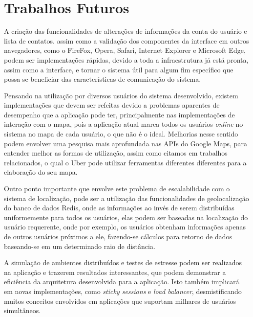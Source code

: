 \chapter{Trabalhos Futuros}
A criação das funcionalidades de alterações de informações da conta do usuário e lista de contatos. assim como a validação dos componentes da interface em outros navegadores, como o FireFox, Opera, Safari, Internet Explorer e Microsoft Edge, podem ser implementações rápidas, devido a toda a infraestrutura já está pronta, assim como a interface, e tornar o sistema útil para algum fim específico que possa se beneficiar das características de comunicação do sistema.

Pensando na utilização por diversos usuários do sistema desenvolvido, existem implementações que devem ser refeitas devido a problemas aparentes de desempenho que a aplicação pode ter, principalmente nas implementações de interação com o mapa, pois a aplicação atual marca todos os usuários \textit{online} no sistema no mapa de cada usuário, o que não é o ideal. Melhorias nesse sentido podem envolver uma pesquisa mais aprofundada nas APIs do Google Maps, para entender melhor as formas de utilização, assim como citamos em trabalhos relacionados, o qual o Uber pode utilizar ferramentas diferentes diferentes para a elaboração do seu mapa. 

Outro ponto importante que envolve este problema de escalabilidade com o sistema de localização, pode ser a utilização das funcionalidades de geolocalização do banco de dados Redis, onde as informações ao invés de serem distribuídas uniformemente para todos os usuários, elas podem ser baseadas na localização do usuário requerente, onde por exemplo, os usuários obtenham informações apenas de outros usuários próximos a ele, fazendo-se cálculos para retorno de dados baseando-se em um determinado raio de distância.

A simulação de ambientes distribuídos e testes de estresse podem ser realizados na aplicação e trazerem resultados interessantes, que podem demonstrar a eficiência da arquitetura desenvolvida para a aplicação. Isto também implicará em novas implementações, como \textit{sticky sessions} e \textit{load balancer}, desmistificando muitos conceitos envolvidos em aplicações que suportam milhares de usuários simultâneos.